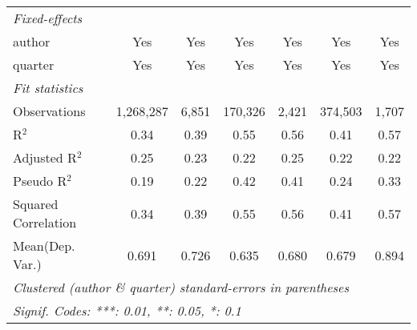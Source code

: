 \begin{tabular}{lcccccc}
   \emph{Fixed-effects}\\
   author                                                     & Yes            & Yes           & Yes           & Yes           & Yes            & Yes\\  
   quarter                                                    & Yes            & Yes           & Yes           & Yes           & Yes            & Yes\\  
   \midrule
   \emph{Fit statistics}\\
   Observations                                               & 1,268,287      & 6,851         & 170,326       & 2,421         & 374,503        & 1,707\\  
   R$^2$                                                      & 0.34           & 0.39          & 0.55          & 0.56          & 0.41           & 0.57\\  
   Adjusted R$^2$                                             & 0.25           & 0.23          & 0.22          & 0.25          & 0.22           & 0.22\\  
   Pseudo R$^2$                                               & 0.19           & 0.22          & 0.42          & 0.41          & 0.24           & 0.33\\  
   Squared Correlation                                        & 0.34           & 0.39          & 0.55          & 0.56          & 0.41           & 0.57\\  
Mean(Dep. Var.) & 0.691 & 0.726 & 0.635 & 0.680 & 0.679 & 0.894 \\
   \midrule \midrule
   \multicolumn{7}{l}{\emph{Clustered (author \& quarter) standard-errors in parentheses}}\\
   \multicolumn{7}{l}{\emph{Signif. Codes: ***: 0.01, **: 0.05, *: 0.1}}\\
\end{tabular}
\par\endgroup
